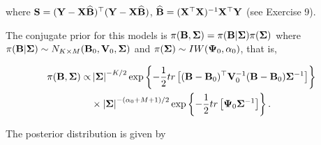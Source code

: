 where ${\bf{S}}= ({\bf{Y}}-{\bf{X}}\widehat{\bf{B}})^{\top}({\bf{Y}}-{\bf{X}}\widehat{\bf{B}})$, $\widehat{\bf{B}}= ({\bf{X}}^{\top}{\bf{X}})^{-1}{\bf{X}}^{\top}{\bf{Y}}$ (see Exercise 9).

The conjugate prior for this models is $\pi({\bf{B}},{\bf{\Sigma}})=\pi({\bf{B}}|{\bf{\Sigma}})\pi({\bf{\Sigma}})$ where $\pi({\bf{B}}|{\bf \Sigma})\sim N_{K\times M}({\bf{B}}_{0},{\bf{V}}_{0},{\bm{\Sigma}})$ and $\pi({\bm{\Sigma}})\sim IW({\bf{\Psi}}_{0},\alpha_{0})$, that is,

\begin{align*}
	\pi ({\bf{B}},{\bm{\Sigma}})\propto &\left|{\bm{\Sigma}} \right|^{-K/2}\exp\left\lbrace -\frac{1}{2}tr\left[({\bf{B}}-{\bf{B}}_{0})^{\top}{\bf{V}}_{0}^{-1}({\bf{B}}-{\bf{B}}_{0}){\bf \Sigma}^{-1}\right]\right\rbrace \\
	& \times \left|{\bf \Sigma} \right|^{-(\alpha_{0}+M+1)/2}\exp\left\lbrace -\frac{1}{2}tr \left[ {\bf{\Psi}}_{0} {\bf \Sigma}^{-1}\right] \right\rbrace.
\end{align*}

The posterior distribution is given by

